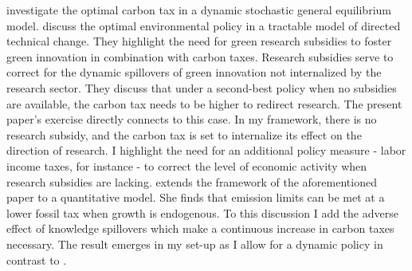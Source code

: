  \cite{Golosov2014OptimalEquilibrium} investigate the optimal carbon tax in a dynamic stochastic general equilibrium model.  
\cite{Acemoglu2012TheChange} discuss the optimal environmental policy in a tractable model of directed technical change.
They highlight the need for green research subsidies to foster green innovation in combination with carbon taxes. Research subsidies serve to correct for the dynamic spillovers of green innovation not internalized by the research sector. They discuss that under a second-best policy when no subsidies are available, the carbon tax needs to be higher to redirect research. The present paper's exercise 
directly connects to this case. In my framework, there is no research subsidy, and the carbon tax is set to internalize its effect on the direction of research. I highlight the need for an additional policy measure - labor income taxes, for instance - to correct the level of economic activity when research subsidies are lacking. 
\cite{Fried2018ClimateAnalysis} extends the framework of the aforementioned paper to a quantitative model. %
She finds that emission limits can be met at a lower fossil tax when growth is endogenous. To this discussion I add the adverse effect of knowledge spillovers which make a continuous increase in carbon taxes necessary. The result emerges in my set-up as I allow for a dynamic policy in contrast to \cite{Fried2018ClimateAnalysis}. 



